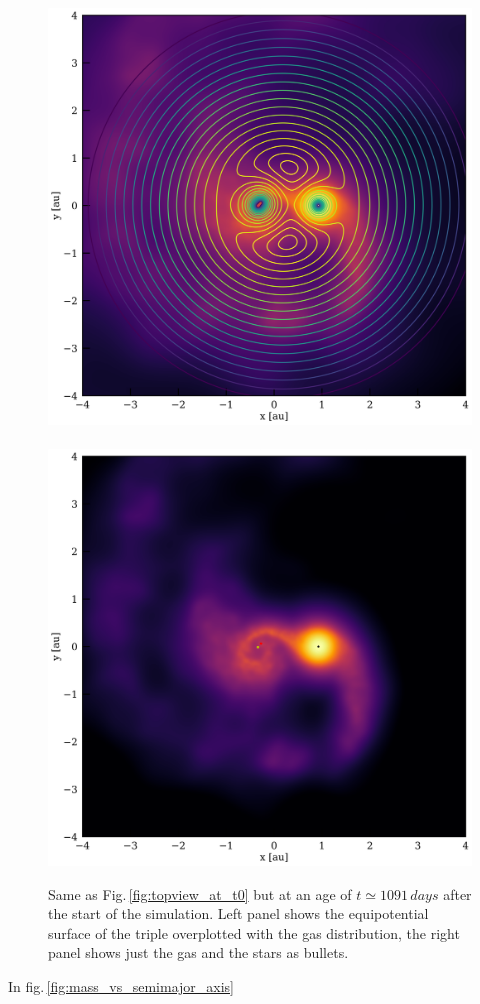\documentclass{aastex62}
\begin{document}
\cite{2018arXiv181208175M}


\begin{figure}[ht!]
  \includegraphics[width=0.49\columnwidth]{fig_BBSS_Lgas_M14Msun_A010au_t3360.pdf}
~  \includegraphics[width=0.51\columnwidth]{fig_BBSS_gas_M14Msun_A010au_t3360.pdf}
\caption{Same as Fig.\,\ref{fig:topview_at_t0} but at an age of $t
  \simeq 1091\,days$ after the start of the simulation. Left panel
  shows the equipotential surface of the triple overplotted with the
  gas distribution, the right panel shows just the gas and the stars
  as bullets.
\label{fig:topview_at_t1000day}}
\end{figure}

In fig.\,\ref{fig:mass_vs_semimajor_axis}
\end{document}
